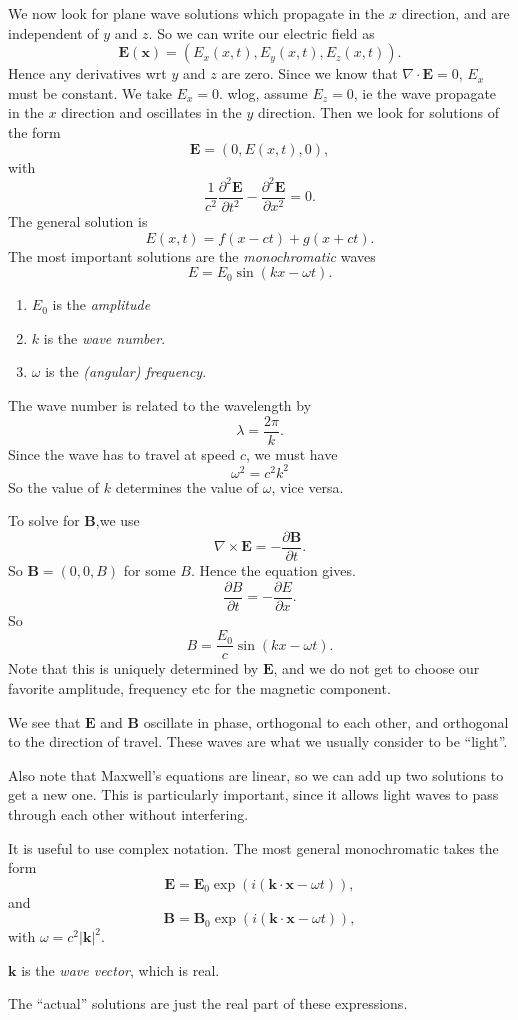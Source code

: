 \documentclass[a4paper]{article}
\begin{document}
We now look for plane wave solutions which propagate in the $x$ direction, and are independent of $y$ and $z$. So we can write our electric field as
\[
  \mathbf{E}(\mathbf{x}) = (E_x(x, t), E_y(x, t), E_z(x, t)).
\]
Hence any derivatives wrt $y$ and $z$ are zero. Since we know that $\nabla \cdot \mathbf{E} = 0$, $E_x$ must be constant. We take $E_x = 0$. wlog, assume $E_z = 0$, ie the wave propagate in the $x$ direction and oscillates in the $y$ direction. Then we look for solutions of the form
\[
  \mathbf{E} = (0, E(x, t), 0),
\]
with
\[
  \frac{1}{c^2}\frac{\partial^2 \mathbf{E}}{\partial t^2} - \frac{\partial^2 \mathbf{E}}{\partial x^2} = 0.
\]
The general solution is
\[
  E(x, t) = f(x - ct) + g(x + ct).
\]
The most important solutions are the \emph{monochromatic} waves
\[
  E = E_0 \sin (kx - \omega t).
\]
\begin{defi}\leavevmode
  \begin{enumerate}
    \item $E_0$ is the \emph{amplitude}
    \item $k$ is the \emph{wave number}.
    \item $\omega$ is the \emph{(angular) frequency}.
  \end{enumerate}
  The wave number is related to the wavelength by
  \[
    \lambda = \frac{2\pi}{k}.
  \]
  Since the wave has to travel at speed $c$, we must have
  \[
    \omega^2 = c^2 k^2
  \]
  So the value of $k$ determines the value of $\omega$, vice versa.
\end{defi}
To solve for $\mathbf{B}$,we use
\[
  \nabla\times \mathbf{E} = -\frac{\partial \mathbf{B}}{\partial t}.
\]
So $\mathbf{B} = (0, 0, B)$ for some $B$. Hence the equation gives.
\[
  \frac{\partial B}{\partial t} = -\frac{\partial E}{\partial x}.
\]
So
\[
  B = \frac{E_0}{c}\sin(kx - \omega t).
\]
Note that this is uniquely determined by $\mathbf{E}$, and we do not get to choose our favorite amplitude, frequency etc for the magnetic component.

We see that $\mathbf{E}$ and $\mathbf{B}$ oscillate in phase, orthogonal to each other, and orthogonal to the direction of travel. These waves are what we usually consider to be ``light''.

Also note that Maxwell's equations are linear, so we can add up two solutions to get a new one. This is particularly important, since it allows light waves to pass through each other without interfering.

It is useful to use complex notation. The most general monochromatic takes the form
\[
  \mathbf{E} = \mathbf{E}_0 \exp(i(\mathbf{k}\cdot \mathbf{x} - \omega t)),
\]
and
\[
  \mathbf{B} = \mathbf{B}_0 \exp(i(\mathbf{k}\cdot \mathbf{x} - \omega t)),
\]
with $\omega = c^2 |\mathbf{k}|^2$.
\begin{defi}
  $\mathbf{k}$ is the \emph{wave vector}, which is real.
\end{defi}
The ``actual'' solutions are just the real part of these expressions.
\end{document}
